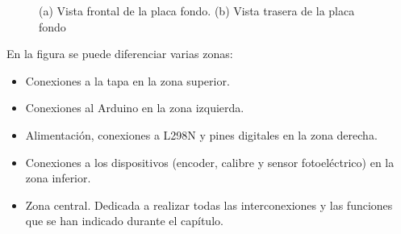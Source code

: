 \begin{figure}[htpb]
{    }
    \caption{(a) Vista frontal de la placa fondo. (b) Vista trasera de la placa fondo}
    \label{fig:placafondo} 
    \end{figure} 

En la figura se puede diferenciar varias zonas:

\begin{itemize}
    \item Conexiones a la tapa en la zona superior.
    \item Conexiones al Arduino en la zona izquierda.
    \item Alimentación, conexiones a L298N y pines digitales en la zona derecha.
    \item Conexiones a los dispositivos (encoder, calibre y sensor fotoeléctrico) en la zona inferior.
    \item Zona central. Dedicada a realizar todas las interconexiones y las funciones que se han 
    indicado durante el capítulo.
\end{itemize}